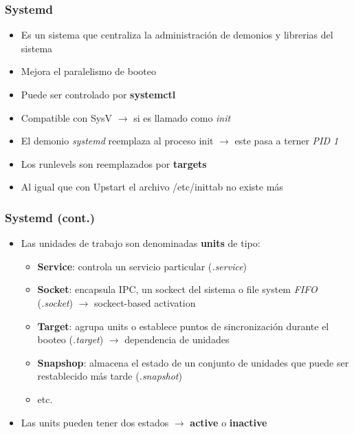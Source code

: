 \begin{frame}
  	\frametitle{\textbf{Systemd}}
  	\begin{itemize}
		\item Es un sistema que centraliza la administración de demonios y librerias del sistema
		\item Mejora el paralelismo de booteo
		\item Puede ser controlado por \textbf{systemctl}
		\item Compatible con SysV $\rightarrow$ si es llamado como \emph{init}
		\item El demonio \emph{systemd} reemplaza al proceso init $\rightarrow$ este pasa a terner \emph{PID 1}
		\item Los runlevels son reemplazados por \textbf{targets}
		\item Al igual que con Upstart el archivo /etc/inittab no existe más
  	\end{itemize}
\end{frame}

\begin{frame}
  	\frametitle{\textbf{Systemd} (cont.)}
  	\begin{itemize}
		\item Las unidades de trabajo son denominadas \textbf{units} de tipo:
		\begin{itemize}
			\item \textbf{Service}: controla un servicio particular (\emph{.service})
			\item \textbf{Socket}: encapsula IPC, un sockect del sistema o file system \emph{FIFO} (\emph{.socket}) $\rightarrow$ sockect-based activation
			\item \textbf{Target}: agrupa units o establece puntos de sincronización durante el booteo (\emph{.target}) $\rightarrow$ dependencia de unidades
			\item \textbf{Snapshop}: almacena el estado de un conjunto de unidades que puede ser restablecido más tarde (\emph{.snapshot})
			\item etc.
		\end{itemize}
		\item Las units pueden tener dos estados $\rightarrow$ \textbf{active} o \textbf{inactive}
  	\end{itemize}
\end{frame}

